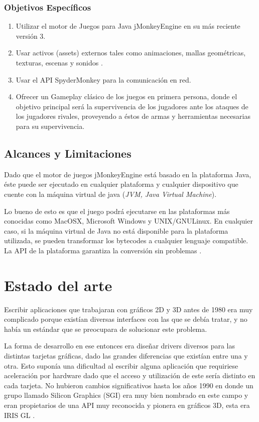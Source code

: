 \documentclass[a4paper,12pt,openany,oneside]{book}
\begin{document}
\subsection{Objetivos Específicos}
\begin{enumerate}
\item Utilizar el motor de Juegos para Java jMonkeyEngine en su más reciente versión 3.
\item Usar activos (assets) externos tales como animaciones, mallas geométricas, texturas, escenas y sonidos \cite{JMONKEY}.
\item Usar el API SpyderMonkey \cite{BEGINNERS} para la comunicación en red.
\item Ofrecer un Gameplay clásico de los juegos en primera persona, donde el objetivo principal será la supervivencia de los jugadores ante los ataques de los jugadores rivales, proveyendo a éstos de armas y herramientas
necesarias para su supervivencia.
\end{enumerate}
\section{Alcances y Limitaciones}
Dado que el motor de juegos jMonkeyEngine está basado en la plataforma Java, éste puede ser ejecutado en cualquier plataforma y cualquier dispositivo que cuente con la máquina virtual de java (\textit{JVM, Java Virtual Machine}).

Lo bueno de esto es que el juego podrá ejecutarse en las plataformas más conocidas como MacOSX, Microsoft Windows y UNIX/GNULinux. En cualquier caso, si la máquina virtual de Java no está disponible para la plataforma utilizada, se pueden transformar los bytecodes a cualquier lenguaje compatible. La API de la plataforma garantiza la conversión sin problemas \cite{JMONKEY}.
\chapter{Estado del arte}
Escribir aplicaciones que trabajaran con gráficos 2D y 3D antes de 1980 era muy complicado porque existían diversas interfaces con las que se debía tratar, y no había un estándar que se preocupara de solucionar este problema.

La forma de desarrollo en ese entonces era diseñar drivers diversos para las distintas tarjetas gráficas, dado las grandes diferencias que existían entre una y otra. Esto suponía una dificultad al escribir alguna aplicación que requiriese aceleración por hardware dado que el acceso y utilización de este sería distinto en cada tarjeta. No hubieron cambios significativos hasta los años 1990 en donde un grupo llamado Silicon Graphics (SGI) era muy bien nombrado en este campo y eran propietarios de una API muy reconocida y pionera en gráficos 3D, esta era IRIS GL \cite{WIKI}.
\end{document}
